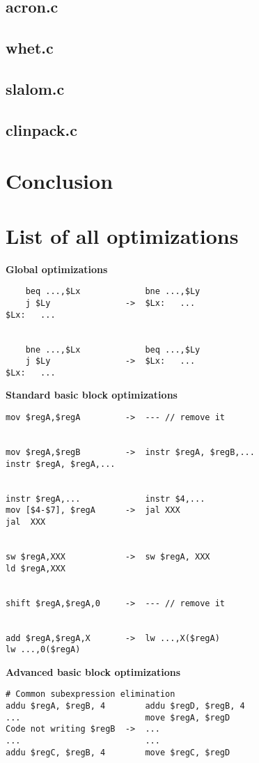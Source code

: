 \documentclass[10pt,a4paper]{article}
\begin{document}
\subsection{acron.c}

\subsection{whet.c}

\subsection{slalom.c}

\subsection{clinpack.c}

\section{Conclusion}

\appendix

\section{List of all optimizations}

\label{opt}

\textbf{Global optimizations}

\begin{verbatim}
    beq ...,$Lx             bne ...,$Ly
    j $Ly               ->  $Lx:   ...
$Lx:   ...


    bne ...,$Lx             beq ...,$Ly
    j $Ly               ->  $Lx:   ...
$Lx:   ...
\end{verbatim}
\textbf{Standard basic block optimizations}

\begin{verbatim}
mov $regA,$regA         ->  --- // remove it


mov $regA,$regB         ->  instr $regA, $regB,...
instr $regA, $regA,...


instr $regA,...             instr $4,...
mov [$4-$7], $regA      ->  jal XXX
jal  XXX


sw $regA,XXX            ->  sw $regA, XXX
ld $regA,XXX


shift $regA,$regA,0     ->  --- // remove it


add $regA,$regA,X       ->  lw ...,X($regA)
lw ...,0($regA)
\end{verbatim}
\textbf{Advanced basic block optimizations}

\begin{verbatim}
# Common subexpression elimination
addu $regA, $regB, 4        addu $regD, $regB, 4
...                         move $regA, $regD
Code not writing $regB  ->  ...
...                         ...
addu $regC, $regB, 4        move $regC, $regD
\end{verbatim}
\end{document}

